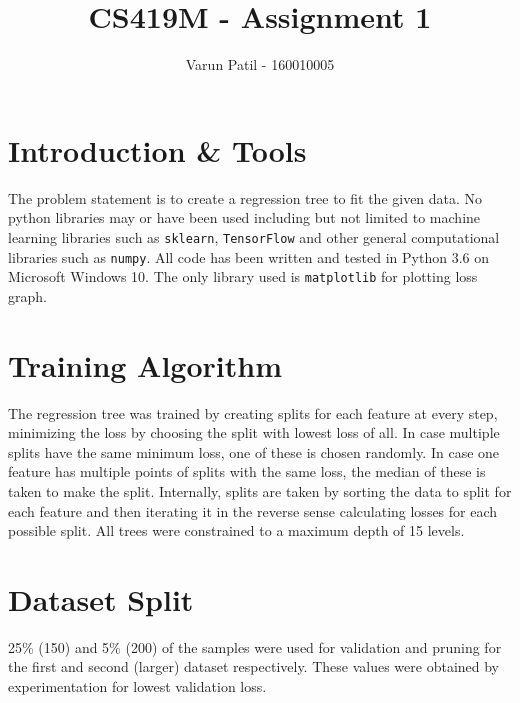 \documentclass{article}
\title{CS419M - Assignment 1}
\author{Varun Patil - 160010005}
\begin{document}
	\maketitle
	
\section{Introduction \& Tools}
The problem statement is to create a regression tree to fit the given data. No python libraries may or have been used including but not limited to machine learning libraries such as \texttt{sklearn}, \texttt{TensorFlow} and other general computational libraries such as \texttt{numpy}. All code has been written and tested in Python 3.6 on Microsoft Windows 10. The only library used is \texttt{matplotlib} for plotting loss graph.

\section{Training Algorithm}
The regression tree was trained by creating splits for each feature at every step, minimizing the loss by choosing the split with lowest loss of all. In case multiple splits have the same minimum loss, one of these is chosen randomly. In case one feature has multiple points of splits with the same loss, the median of these is taken to make the split. Internally, splits are taken by sorting the data to split for each feature and then iterating it in the reverse sense calculating losses for each possible split. All trees were constrained to a maximum depth of 15 levels.

\section{Dataset Split}
25\% (150) and 5\% (200) of the samples were used for validation and pruning for the first and second (larger) dataset respectively. These values were obtained by experimentation for lowest validation loss.
\end{document}
